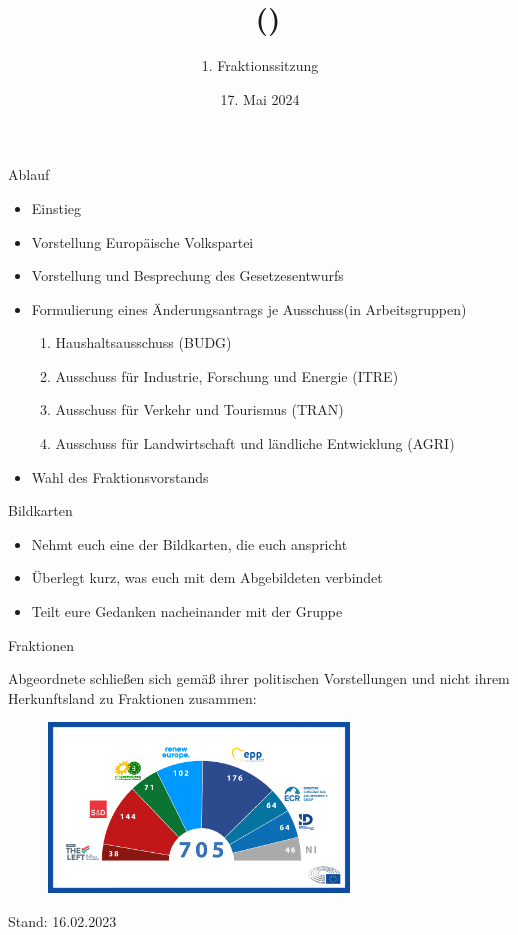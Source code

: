 \documentclass{beamer}
\date{17. Mai 2024}
\title{\Fraktionsname\ (\Fraktionskuerzel)}
\subtitle{1. Fraktionssitzung}
\newcommand{\Fraktionsname}{Europäische Volkspartei}
\newcommand{\Fraktionsname}{Progressive Allianz der Sozialdemokraten}
\newcommand{\Fraktionsname}{Renew Europe}
\newcommand{\Fraktionsname}{Die Grünen/Europäische Freie Allianz}
\newcommand{\Fraktionsname}{Identität \& Demokratie}
\newcommand{\ausschuesse}{
   		     \begin{enumerate}
        		    \item Haushaltsausschuss (BUDG)
            		\item Ausschuss für Industrie, Forschung und Energie (ITRE)
    	    		    \item Ausschuss für Verkehr und Tourismus (TRAN)
    		        \item Ausschuss für Landwirtschaft und ländliche Entwicklung (AGRI)
	        \end{enumerate}
		}
\newcommand{\ausschuesse}{
            \begin{enumerate}
                \item Ausschuss für bürgerliche Freiheiten, Justiz und Inneres (LIBE)
                \item Ausschuss für Auswärtige Angelegenheiten (AFET)
                \item Unterausschuss für Menschenrechte (DROI)
            \end{enumerate}
    		}
\newcommand{\ausschuesse}{
            \begin{enumerate}
                \item Haushaltsausschuss (BUDG)
                \item Ausschuss für bürgerliche Freiheiten, Justiz und Inneres (LIBE)
                \item Unterausschuss für Sicherheit und Verteidigung (SEDE)
            \end{enumerate}
    		}
\begin{document}
\frame{\titlepage}



\begin{frame}{Ablauf}
\vspace{-1.5cm}
\begin{itemize}
    \item Einstieg
    \item Vorstellung \Fraktionsname
    \item Vorstellung und Besprechung des Gesetzesentwurfs
    \item Formulierung eines Änderungsantrags je Ausschuss\newline (in Arbeitsgruppen)
    \ausschuesse
    \item Wahl des Fraktionsvorstands
\end{itemize}
\end{frame}

\begin{frame}{Bildkarten}
\vspace{-1cm}
\begin{itemize}
    \item Nehmt euch eine der Bildkarten, die euch anspricht
    \item Überlegt kurz, was euch mit dem Abgebildeten verbindet
    \item Teilt eure Gedanken nacheinander mit der Gruppe
\end{itemize}
\end{frame}

\begin{frame}{Fraktionen}
\vspace{-0.5cm}
\begin{center}
    Abgeordnete schließen sich gemäß ihrer politischen Vorstellungen und nicht ihrem Herkunftsland zu Fraktionen zusammen:
\end{center}
\begin{figure}[h]
    \centering
    \includegraphics[width=8cm]{Bilder/EP_seats.jpg}
\end{figure}
\begin{center}
    {\tiny Stand: 16.02.2023}
\end{center}
\end{frame}
\end{document}
